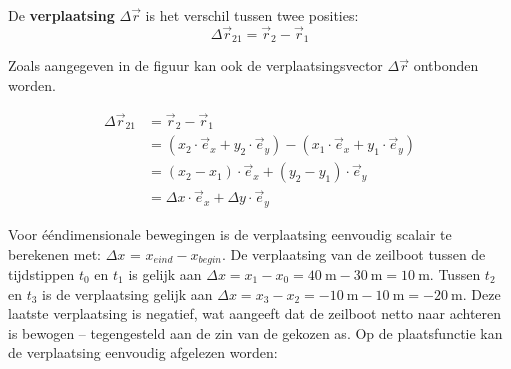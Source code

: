 \documentclass{ximera}
\begin{document}
\begin{definition}
De \textbf{verplaatsing} \(\Delta \vec{r}\) is het verschil tussen twee posities:
\[
\Delta \vec{r}_{21} = \vec{r}_2 - \vec{r}_1
\]

\begin{image}[0.3\textwidth]
\end{image}


Zoals aangegeven in de figuur kan ook de verplaatsingsvector \(\Delta\vec{r}\) ontbonden worden. 

\begin{align*}
\Delta\vec{r}_{21} &= \vec{r}_2 - \vec{r}_1 \\ 
					&= (x_2\cdot\vec{e}_x + y_2\cdot\vec{e}_y) - (x_1\cdot\vec{e}_x + y_1\cdot\vec{e}_y) \\
					&= (x_2-x_1)\cdot\vec{e}_x + (y_2-y_1)\cdot\vec{e}_y \\
					&= \Delta x \cdot\vec{e}_x + \Delta y \cdot\vec{e}_y
\end{align*}


\end{definition}

Voor ééndimensionale bewegingen is de verplaatsing eenvoudig scalair te berekenen met: $\Delta x$ = $x_{eind}-x_{begin}$.
De verplaatsing van de zeilboot tussen de tijdstippen $t_0$ en $t_1$ is gelijk aan \( \Delta x = x_1-x_0 = \SI{40}{\meter} - \SI{30}{\meter} = \SI{10}{\meter}\).  
Tussen $t_2$ en $t_3$ is de verplaatsing gelijk aan \(\Delta x = x_3 - x_2=\SI{-10}{\meter} - \SI{10}{\meter} = \SI{-20}{\meter}\). 
Deze laatste verplaatsing is negatief, wat aangeeft dat de zeilboot netto naar achteren is bewogen -- tegengesteld aan de zin van de gekozen as.
Op de plaatsfunctie kan de verplaatsing eenvoudig afgelezen worden: 
\end{document}
